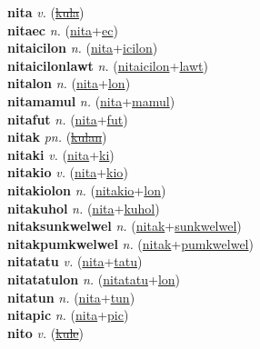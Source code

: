 \textbf{nita} \textit{v.} (\hyperref[kula]{\sout{kula}})
 \label{nita} \\
\textbf{nitaec} \textit{n.} (\hyperref[nita]{nita}+\hyperref[ec]{ec})
 \label{nitaec} \\
\textbf{nitaicilon} \textit{n.} (\hyperref[nita]{nita}+\hyperref[icilon]{icilon})
 \label{nitaicilon} \\
\textbf{nitaicilonlawt} \textit{n.} (\hyperref[nitaicilon]{nitaicilon}+\hyperref[lawt]{lawt})
 \label{nitaicilonlawt} \\
\textbf{nitalon} \textit{n.} (\hyperref[nita]{nita}+\hyperref[lon]{lon})
 \label{nitalon} \\
\textbf{nitamamul} \textit{n.} (\hyperref[nita]{nita}+\hyperref[mamul]{mamul})
 \label{nitamamul} \\
\textbf{nitafut} \textit{n.} (\hyperref[nita]{nita}+\hyperref[fut]{fut})
 \label{nitafut} \\
\textbf{nitak} \textit{pn.} (\hyperref[kulan]{\sout{kulan}})
 \label{nitak} \\
\textbf{nitaki} \textit{v.} (\hyperref[nita]{nita}+\hyperref[ki]{ki})
 \label{nitaki} \\
\textbf{nitakio} \textit{v.} (\hyperref[nita]{nita}+\hyperref[kio]{kio})
 \label{nitakio} \\
\textbf{nitakiolon} \textit{n.} (\hyperref[nitakio]{nitakio}+\hyperref[lon]{lon})
 \label{nitakiolon} \\
\textbf{nitakuhol} \textit{n.} (\hyperref[nita]{nita}+\hyperref[kuhol]{kuhol})
 \label{nitakuhol} \\
\textbf{nitaksunkwelwel} \textit{n.} (\hyperref[nitak]{nitak}+\hyperref[sunkwelwel]{sunkwelwel})
 \label{nitaksunkwelwel} \\
\textbf{nitakpumkwelwel} \textit{n.} (\hyperref[nitak]{nitak}+\hyperref[pumkwelwel]{pumkwelwel})
 \label{nitakpumkwelwel} \\
\textbf{nitatatu} \textit{v.} (\hyperref[nita]{nita}+\hyperref[tatu]{tatu})
 \label{nitatatu} \\
\textbf{nitatatulon} \textit{n.} (\hyperref[nitatatu]{nitatatu}+\hyperref[lon]{lon})
 \label{nitatatulon} \\
\textbf{nitatun} \textit{n.} (\hyperref[nita]{nita}+\hyperref[tun]{tun})
 \label{nitatun} \\
\textbf{nitapic} \textit{n.} (\hyperref[nita]{nita}+\hyperref[pic]{pic})
 \label{nitapic} \\
\textbf{nito} \textit{v.} (\hyperref[kule]{\sout{kule}})
 \label{nito} \\
